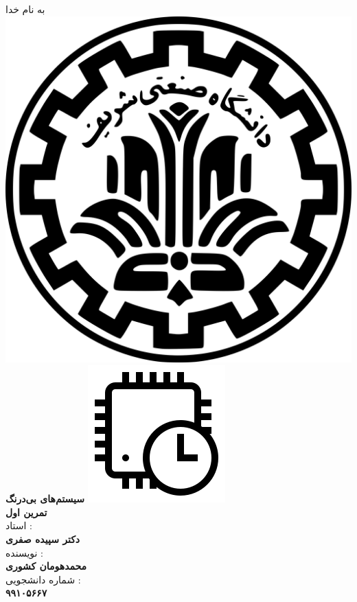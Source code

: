 \begin{center}
    به نام خدا
    \\
    \includegraphics[scale=0.02]{commons/sharif.png}
    \\
    \vspace*{5mm}
    \textbf{\Huge{سیستم‌های بی‌درنگ}}
    \hspace*{1mm}
    \vspace*{5mm}
    \includegraphics[scale=0.15]{commons/course.png}
    \\
    \vspace*{5mm}
    \textbf{تمرین اول}
    \\
    \vspace*{7mm}
    استاد :
    \\
    \vspace*{2mm}
    \textbf{\Large{دکتر سپیده صفری}}
    \\
    \vspace*{7mm}
    نویسنده :
    \\
    \vspace*{2mm}
    \textbf{\Large{محمدهومان کشوری}}
    \\
    \vspace*{7mm}
    شماره دانشجویی :
    \\
    \vspace*{2mm}
    \textbf{\Large{۹۹۱۰۵۶۶۷}}
\end{center}